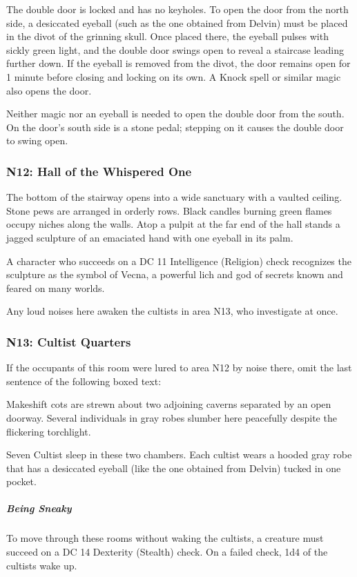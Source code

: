 \documentclass[10pt,a4paper,twoside,bg=print,twocolumn,openany,nodeprecatedcode]{dndbook}
\begin{document}
The double door is locked and has no keyholes. To open the door from the north side, a desiccated eyeball (such as the one obtained from Delvin) must be placed in the divot of the grinning skull. Once placed there, the eyeball pulses with sickly green light, and the double door swings open to reveal a staircase leading further down. If the eyeball is removed from the divot, the door remains open for 1 minute before closing and locking on its own. A Knock spell or similar magic also opens the door.

Neither magic nor an eyeball is needed to open the double door from the south. On the door's south side is a stone pedal; stepping on it causes the double door to swing open.
\subsubsection{N12: Hall of the Whispered One}
\begin{DndReadAloud}{}
The bottom of the stairway opens into a wide sanctuary with a vaulted ceiling. Stone pews are arranged in orderly rows. Black candles burning green flames occupy niches along the walls. Atop a pulpit at the far end of the hall stands a jagged sculpture of an emaciated hand with one eyeball in its palm.
\end{DndReadAloud}

A character who succeeds on a DC 11 Intelligence (Religion) check recognizes the sculpture as the symbol of Vecna, a powerful lich and god of secrets known and feared on many worlds.

Any loud noises here awaken the cultists in area N13, who investigate at once.
\subsubsection{N13: Cultist Quarters}
If the occupants of this room were lured to area N12 by noise there, omit the last sentence of the following boxed text:
\begin{DndReadAloud}{}
Makeshift cots are strewn about two adjoining caverns separated by an open doorway. Several individuals in gray robes slumber here peacefully despite the flickering torchlight.
\end{DndReadAloud}

Seven Cultist sleep in these two chambers. Each cultist wears a hooded gray robe that has a desiccated eyeball (like the one obtained from Delvin) tucked in one pocket.
\subparagraph{Being Sneaky}
To move through these rooms without waking the cultists, a creature must succeed on a DC 14 Dexterity (Stealth) check. On a failed check, 1d4 of the cultists wake up.
\end{document}
